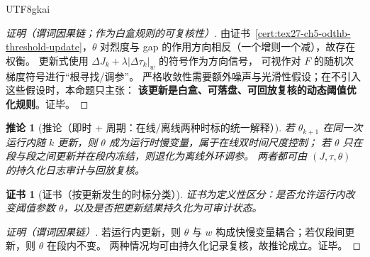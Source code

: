 \documentclass[12pt]{article}
\newtheorem{corollary}{推论}[section]
\newtheorem{Certificate}{证书}[section]
\begin{document}
\begin{CJK*}{UTF8}{gkai}
\begin{proof}[证明（谓词因果链；作为白盒规则的可复核性）]
由证书~\ref{cert:tex27-ch5-odthb-threshold-update}，$\theta$ 对烈度与 gap 的作用方向相反（一个增则一个减），故存在权衡。
更新式使用 $\Delta J_k+\lambda|\Delta\tau_k|_w$ 的符号作为方向信号，
可视作对 $F$ 的随机次梯度符号进行“根寻找/调参”。
严格收敛性需要额外噪声与光滑性假设；在不引入这些假设时，本命题只主张：
\textbf{该更新是白盒、可落盘、可回放复核的动态阈值优化规则}。证毕。
\end{proof}

\begin{corollary}[推论（即时 + 周期：在线/离线两种时标的统一解释）]
\label{cor:tex27-ch5-odthb-online-offline}
若 $\theta_{k+1}$ 在同一次运行内随 $k$ 更新，则 $\theta$ 成为运行时慢变量，属于在线双时间尺度控制；
若 $\theta$ 只在段与段之间更新并在段内冻结，则退化为离线外环调参。
两者都可由 $(J,\tau,\theta)$ 的持久化日志审计与回放复核。
\end{corollary}

\begin{Certificate}[证书（按更新发生的时标分类）]
\label{cert:tex27-ch5-odthb-online-offline}
证书为定义性区分：是否允许运行内改变阈值参数 $\theta$，以及是否把更新结果持久化为可审计状态。
\end{Certificate}

\begin{proof}[证明（谓词因果链）]
若运行内更新，则 $\theta$ 与 $w$ 构成快慢变量耦合；若仅段间更新，则 $\theta$ 在段内不变。
两种情况均可由持久化记录复核，故推论成立。证毕。
\end{proof}


\end{CJK*}
\end{document}
